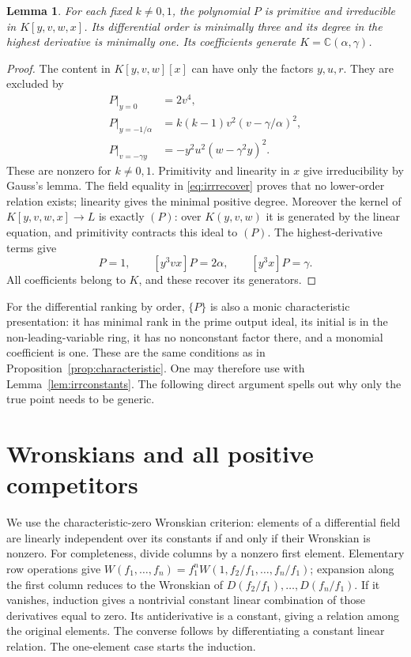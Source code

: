 \documentclass[10pt,a4paper]{article}
\newtheorem{lemma}[theorem]{Lemma}
\theoremstyle{definition}\newtheorem{definition}[theorem]{Definition}
\newcommand{\C}{\mathbb C}
\begin{document}
\begin{lemma}
\label{lem:irrminimal}
For each fixed $k\ne0,1$, the polynomial $P$ is primitive and
irreducible in $K[y,v,w,x]$. Its differential order is minimally three
and its degree in the highest derivative is minimally one. Its
coefficients generate $K=\C(\alpha,\gamma)$.
\end{lemma}
\begin{proof}
The content in $K[y,v,w][x]$ can have only the factors $y,u,r$.
They are excluded by
\begin{equation}
\begin{aligned}
P|_{y=0}&=2v^4,\\
P|_{y=-1/\alpha}&=k(k-1)v^2(v-\gamma/\alpha)^2,\\
P|_{v=-\gamma y}&=-y^2u^2(w-\gamma^2y)^2.
\end{aligned}
\label{eq:irrcontent}
\end{equation}
These are nonzero for $k\ne0,1$. Primitivity and linearity in $x$
give irreducibility by Gauss's lemma. The field equality in
\eqref{eq:irrrecover} proves that no lower-order relation exists;
linearity gives the minimal positive degree. Moreover the kernel of
$K[y,v,w,x]\to L$ is exactly $(P)$: over $K(y,v,w)$ it is generated
by the linear equation, and primitivity contracts this ideal to $(P)$.
The highest-derivative terms give
\begin{equation}
[y^2vx]P=1,\qquad [y^3vx]P=2\alpha,\qquad [y^3x]P=\gamma.
\label{eq:irrcoeff}
\end{equation}
All coefficients belong to $K$, and these recover its generators.
\end{proof}

For the differential ranking by order, $\{P\}$ is also a monic
characteristic presentation: it has minimal rank in the prime output
ideal, its initial is in the non-leading-variable ring, it has no
nonconstant factor there, and a monomial coefficient is one.
These are the same conditions as in Proposition~\ref{prop:characteristic}.
One may therefore use \cite[Corollary~5.7 and Theorem~4.7]{OPT} with
Lemma~\ref{lem:irrconstants}. The following direct argument spells out
why only the true point needs to be generic.

\section{Wronskians and all positive competitors}
\label{sec:wronskian}
We use the characteristic-zero Wronskian criterion: elements of a
differential field are linearly independent over its constants if
and only if their Wronskian is nonzero. For completeness, divide
columns by a nonzero first element. Elementary row operations give
$W(f_1,\ldots,f_n)=f_1^n W(1,f_2/f_1,\ldots,f_n/f_1)$; expansion
along the first column reduces to the Wronskian of
$D(f_2/f_1),\ldots,D(f_n/f_1)$. If it vanishes, induction gives a
nontrivial constant linear combination of those derivatives equal
to zero. Its antiderivative is a constant, giving a relation among
the original elements. The converse follows by differentiating a
constant linear relation. The one-element case starts the induction.
\end{document}
